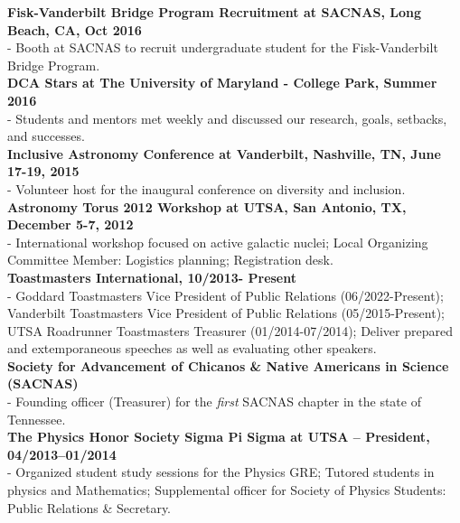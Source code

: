 \documentclass[letter,11pt]{article}
\begin{document}
\noindent
\textbf{Fisk-Vanderbilt Bridge Program Recruitment at SACNAS, Long Beach, CA, Oct 2016} \\
- Booth at SACNAS to recruit undergraduate student for the Fisk-Vanderbilt Bridge Program. \\

\vskip 0.01in
\noindent
\textbf{DCA Stars at The University of Maryland - College Park, Summer 2016} \\
- Students and mentors met weekly and discussed our research, goals, setbacks, and successes. \\

\vskip 0.01in
\noindent
\textbf{Inclusive Astronomy Conference at Vanderbilt, Nashville, TN, June 17-19, 2015} \\
- Volunteer host for the inaugural conference on diversity and inclusion. \\

\vskip 0.01in
\noindent
\textbf{Astronomy Torus 2012 Workshop at UTSA, San Antonio, TX, December 5-7, 2012} \\
- International workshop focused on active galactic nuclei; Local Organizing Committee Member: Logistics planning; Registration desk. \\

\vskip 0.01in
\noindent
\textbf{Toastmasters International, 10/2013- Present} \\
- Goddard Toastmasters Vice President of Public Relations (06/2022-Present); Vanderbilt Toastmasters Vice President of Public Relations (05/2015-Present); UTSA Roadrunner Toastmasters Treasurer (01/2014-07/2014); Deliver prepared and extemporaneous speeches as well as evaluating other speakers. \\

\vskip 0.01in
\noindent
\textbf{Society for Advancement of Chicanos \& Native Americans in Science (SACNAS)} \\
- Founding officer (Treasurer) for the {\it first} SACNAS chapter in the state of Tennessee. \\

\vskip 0.01in
\noindent
\textbf{The Physics Honor Society \text{\textbar} Sigma Pi Sigma at UTSA – President, 04/2013--01/2014} \\
- Organized student study sessions for the Physics GRE; Tutored students in physics and Mathematics; Supplemental officer for Society of Physics Students: Public Relations \& Secretary. \\
\end{document}
